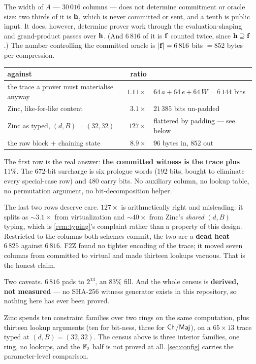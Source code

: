 \begin{remark}\label{rem:isitalot}
The width of $A$ --- $30\,016$ columns --- does not determine commitment or
oracle size: two thirds of it is $\mathbf{h}$, which is never committed or sent, and a
tenth is public input.  It does, however, determine prover work through the
evaluation-shaping and grand-product passes over $\mathbf{h}$.  (And $6\,816$ of it is
$\mathbf{f}$ counted twice, since $\mathbf{h}\supseteq\mathbf{f}$.)  The number controlling the
committed oracle is $|\mathbf{f}|=6\,816$ bits $=852$ bytes per compression.

\begin{center}\small
\begin{tabular}{@{}lrl@{}}
\toprule
against & ratio & \\
\midrule
the trace a prover must materialise anyway & $1.11\times$
  & $64\,a+64\,e+64\,W=6\,144$ bits\\
Zinc\raisebox{0.1ex}{+}, like-for-like content & $3.1\times$
  & $21\,385$ bits un-padded\\
Zinc\raisebox{0.1ex}{+} as typed, $(d,B)=(32,32)$ & $127\times$
  & flattered by padding --- see below\\
the raw block $+$ chaining state & $8.9\times$
  & $96$ bytes in, $852$ out\\
\bottomrule
\end{tabular}
\end{center}

\noindent
The first row is the real answer: \textbf{the committed witness is the trace
plus $11\%$}. The $672$-bit surcharge is six prologue words ($192$ bits, bought
to eliminate every special-case row) and $480$ carry bits. No auxiliary column,
no lookup table, no permutation argument, no bit-decomposition helper.

The last two rows deserve care. $127\times$ is arithmetically right and
misleading: it splits as $\sim\!3.1\times$ from virtualization and $\sim\!40\times$
from Zinc\raisebox{0.1ex}{+}'s \emph{shared} $(d,B)$ typing, which is
\cref{rem:typing}'s complaint rather than a property of this design. Restricted
to the columns both schemes commit, the two are a \textbf{dead heat} --- $6\,825$
against $6\,816$. F2Z found no tighter encoding of the trace; it moved seven
columns from committed to virtual and made thirteen lookups vacuous. That is the
honest claim.

Two caveats. $6\,816$ pads to $2^{13}$, an $83\%$ fill. And the whole census is
\textbf{derived, not measured} --- no SHA-256 witness generator exists in this
repository, so nothing here has ever been proved.
\end{remark}

\begin{remark}
Zinc\raisebox{0.1ex}{+} spends ten constraint families over two rings on the same
computation, plus thirteen lookup arguments (ten for bit-ness, three for
$\mathsf{Ch}$/$\mathsf{Maj}$), on a $65\times13$ trace typed at $(d,B)=(32,32)$. The census above
is three interior families, one ring, no lookups, and the $\mathbb{F}_2$ half is not
proved at all. \cref{sec:config} carries the parameter-level comparison.
\end{remark}
